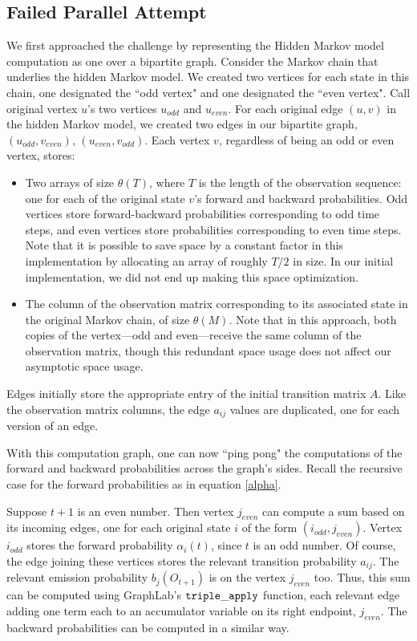 \subsection{Failed Parallel Attempt}
We first approached the challenge by representing the Hidden Markov model computation as one over a bipartite graph.  Consider the Markov chain that underlies the hidden Markov model.  We created two vertices for each state in this chain, one designated the ``odd vertex" and one designated the ``even vertex".  Call original vertex $u$'s two vertices $u_{odd}$ and $u_{even}$. For each original edge $(u, v)$ in the hidden Markov model, we created two edges in our bipartite graph, $(u_{odd}, v_{even})$, $(u_{even}, v_{odd})$.   Each vertex $v$, regardless of being an odd or even vertex, stores: 

\begin{itemize}
	\item Two arrays of size $\theta(T)$, where $T$ is the length of the observation sequence: one for each of the original state $v$'s forward and backward probabilities.  Odd vertices store forward-backward probabilities corresponding to odd time steps, and even vertices store probabilities corresponding to even time steps.  Note that it is possible to save space by a constant factor in this implementation by allocating an array of roughly $T/2$ in size.  In our initial implementation, we did not end up making this space optimization.  
	
	\item The column of the observation matrix corresponding to its associated state in the original Markov chain, of size $\theta(M)$.  Note that in this approach, both copies of the vertex---odd and even---receive the same column of the observation matrix, though this redundant space usage does not affect our asymptotic space usage.
\end{itemize}

Edges initially store the appropriate entry of the initial transition matrix $A$.  Like the observation matrix columns, the edge $a_{ij}$ values are duplicated, one for each version of an edge.

With this computation graph, one can now ``ping pong" the computations of the forward and backward probabilities across the graph's sides.  Recall the recursive case for the forward probabilities as in equation \ref{alpha}.

Suppose $t+1$ is an even number.  Then vertex $j_{even}$ can compute a sum based
on its incoming edges, one for each original state $i$ of the form $(i_{odd},
j_{even})$.  Vertex $i_{odd}$ stores the forward probability $\alpha_{i}(t)$,
since $t$ is an odd number.  Of course, the edge joining these vertices stores
the relevant transition probability $a_{ij}$.  The relevant emission probability
$b_j(O_{t + 1})$ is on the vertex $j_{even}$ too.  Thus, this sum can be computed using GraphLab's $\tt{triple\_apply}$ function, each relevant edge adding one term each to an accumulator variable on its right endpoint, $j_{even}$.  The backward probabilities can be computed in a similar way.

